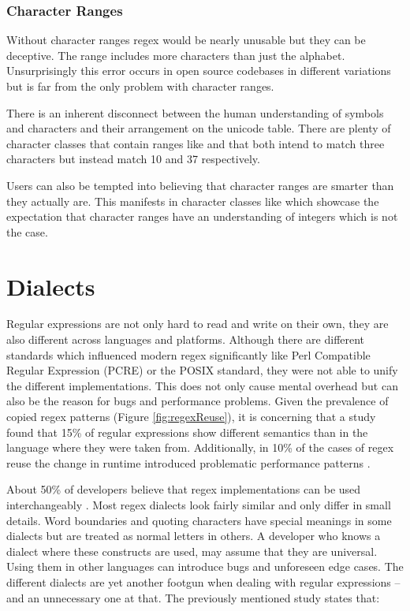 \subsubsection{Character Ranges}

Without character ranges regex would be nearly unusable but they can be deceptive. The range \pattern{[A-z]} includes more characters than just the alphabet. Unsurprisingly this error occurs in open source codebases in different variations \cite{RegexErrorCamelLetterRange}\cite{RegexErrorApacheGeodeLetterRange}\cite{RegexErrorElasticSearchLetterRange} but is far from the only problem with character ranges.

There is an inherent disconnect between the human understanding of symbols and characters and their arrangement on the unicode table. There are plenty of character classes that contain ranges like \pattern{[\%-.]} \cite{RegexErrorJenkinsSpecialRange} and \pattern{[;-\_]} \cite{RegexErrorQuizconnectSpecialRange} that both intend to match three characters but instead match 10 and 37 respectively.

Users can also be tempted into believing that character ranges are smarter than they actually are. This manifests in character classes like \pattern{[0-31]} \cite{RegexErrorHadoopNumberRange} which showcase the expectation that character ranges have an understanding of integers which is not the case.

\section{Dialects}

Regular expressions are not only hard to read and write on their own, they are also different across languages and platforms. Although there are different standards which influenced modern regex significantly like Perl Compatible Regular Expression (PCRE) or the POSIX standard, they were not able to unify the different implementations. This does not only cause mental overhead but can also be the reason for bugs and performance problems. Given the prevalence of copied regex patterns (Figure \ref{fig:regexReuse}), it is concerning that a study found that 15\% of regular expressions show different semantics than in the language where they were taken from. Additionally, in 10\% of the cases of regex reuse the change in runtime introduced problematic performance patterns \cite{RegexNotLinguaFranca}.

About 50\% of developers believe that regex implementations can be used interchangeably \cite{RegexNotLinguaFranca}. Most regex dialects look fairly similar and only differ in small details. Word boundaries  and quoting characters  have special meanings in some dialects but are treated as normal letters in others. A developer who knows a dialect where these constructs are used, may assume that they are universal. Using them in other languages can introduce bugs and unforeseen edge cases. The different dialects are yet another footgun when dealing with regular expressions -- and an unnecessary one at that. The previously mentioned study \cite{RegexNotLinguaFranca} states that:

